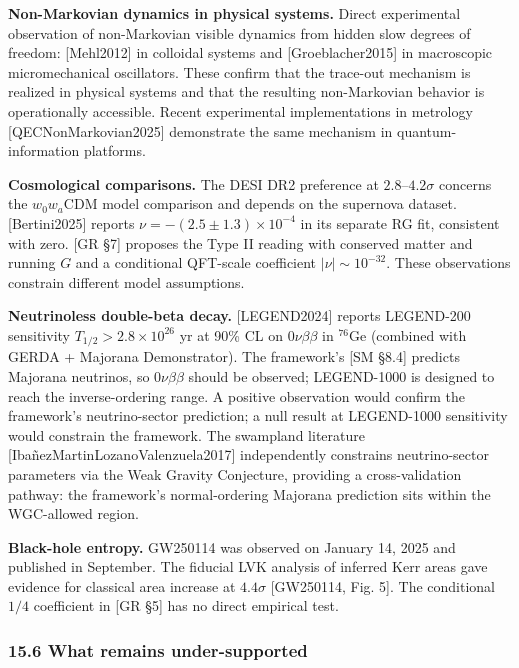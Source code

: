 \documentclass[
]{article}
\begin{document}
\textbf{Non-Markovian dynamics in physical systems.} Direct experimental
observation of non-Markovian visible dynamics from hidden slow degrees
of freedom: {[}Mehl2012{]} in colloidal systems and
{[}Groeblacher2015{]} in macroscopic micromechanical oscillators. These
confirm that the trace-out mechanism is realized in physical systems and
that the resulting non-Markovian behavior is operationally accessible.
Recent experimental implementations in metrology
{[}QECNonMarkovian2025{]} demonstrate the same mechanism in
quantum-information platforms.

\textbf{Cosmological comparisons.} The DESI DR2 preference at
\(2.8\)--\(4.2\sigma\) concerns the \(w_0w_a\)CDM model comparison and
depends on the supernova dataset. {[}Bertini2025{]} reports
\(\nu=-(2.5\pm1.3)\times10^{-4}\) in its separate RG fit, consistent
with zero. {[}GR §7{]} proposes the Type II reading with conserved
matter and running \(G\) and a conditional QFT-scale coefficient
\(\lvert\nu\rvert\sim10^{-32}\). These observations constrain different
model assumptions.

\textbf{Neutrinoless double-beta decay.} {[}LEGEND2024{]} reports
LEGEND-200 sensitivity \(T_{1/2} > 2.8 \times 10^{26}\) yr at 90\% CL on
\(0\nu\beta\beta\) in \(^{76}\)Ge (combined with GERDA + Majorana
Demonstrator). The framework's {[}SM §8.4{]} predicts Majorana
neutrinos, so \(0\nu\beta\beta\) should be observed; LEGEND-1000 is
designed to reach the inverse-ordering range. A positive observation
would confirm the framework's neutrino-sector prediction; a null result
at LEGEND-1000 sensitivity would constrain the framework. The swampland
literature {[}IbañezMartinLozanoValenzuela2017{]} independently
constrains neutrino-sector parameters via the Weak Gravity Conjecture,
providing a cross-validation pathway: the framework's normal-ordering
Majorana prediction sits within the WGC-allowed region.

\textbf{Black-hole entropy.} GW250114 was observed on January 14, 2025
and published in September. The fiducial LVK analysis of inferred Kerr
areas gave evidence for classical area increase at \(4.4\sigma\)
{[}GW250114, Fig. 5{]}. The conditional \(1/4\) coefficient in {[}GR
§5{]} has no direct empirical test.

\hypertarget{what-remains-under-supported}{%
\subsubsection{15.6 What remains
under-supported}\label{what-remains-under-supported}}
\end{document}
